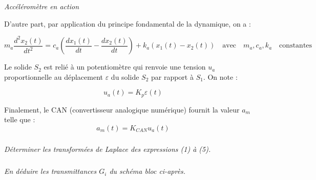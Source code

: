 \documentclass[11pt,oneside]{article}
\begin{document}
{\begin{center}
\textit{Accéléromètre en action}
\end{center}

D’autre part, par application du principe fondamental de la dynamique, on a :

\begin{equation}
m_a\dfrac{d^2x_2(t)}{dt^2}=c_a\left( \dfrac{dx_1(t)}{dt} - \dfrac{dx_2(t)}{dt}\right)
+k_a\left( x_1(t)-x_2(t)\right) \quad \mathrm{avec} \quad m_a, c_a, k_a \quad \mathrm{constantes}
\end{equation}

Le solide $S_2$ est relié à un potentiomètre qui renvoie une tension $u_a$ proportionnelle au déplacement $\varepsilon$ du solide $S_2$ par rapport à $S_1$. On note : 

\begin{equation}
u_a(t)=K_p \varepsilon(t)
\end{equation}

Finalement, le CAN (convertisseur analogique numérique) fournit la valeur $a_m$ telle que :
\begin{equation}
a_m(t) = K_{CAN} u_a (t) 
\end{equation}
}


\subparagraph{}
\textit{Déterminer les transformées de Laplace des expressions (1) à (5).}

\subparagraph{}
\textit{En déduire les transmittances $G_i$ du schéma bloc ci-après.}
\end{document}
